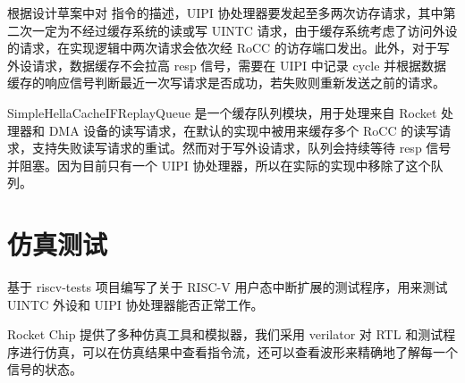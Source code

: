 根据设计草案中对 \Iuipi 指令的描述，UIPI 协处理器要发起至多两次访存请求，其中第二次一定为不经过缓存系统的读或写 UINTC 请求，由于缓存系统考虑了访问外设的请求，在实现逻辑中两次请求会依次经 RoCC 的访存端口发出。此外，对于写外设请求，数据缓存不会拉高 resp 信号，需要在 UIPI 中记录 cycle 并根据数据缓存的响应信号判断最近一次写请求是否成功，若失败则重新发送之前的请求。

SimpleHellaCacheIFReplayQueue 是一个缓存队列模块，用于处理来自 Rocket 处理器和 DMA 设备的读写请求，在默认的实现中被用来缓存多个 RoCC 的读写请求，支持失败读写请求的重试。然而对于写外设请求，队列会持续等待 resp 信号并阻塞。因为目前只有一个 UIPI 协处理器，所以在实际的实现中移除了这个队列。

\section{仿真测试}

基于 riscv-tests 项目\cite{riscvtests}编写了关于 RISC-V 用户态中断扩展的测试程序，用来测试 UINTC 外设和 UIPI 协处理器能否正常工作。

Rocket Chip 提供了多种仿真工具和模拟器，我们采用 verilator 对 RTL 和测试程序进行仿真，可以在仿真结果中查看指令流，还可以查看波形来精确地了解每一个信号的状态。